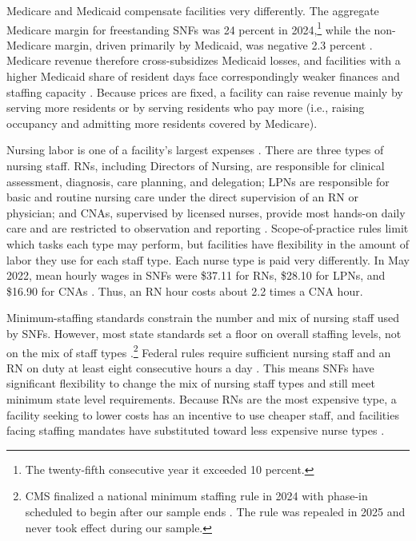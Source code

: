 \documentclass[12pt]{article}
\begin{document}
Medicare and Medicaid compensate facilities very differently. The aggregate Medicare margin for freestanding SNFs was 24 percent in 2024,\footnote{The twenty-fifth consecutive year it exceeded 10 percent.} while the non-Medicare margin, driven primarily by Medicaid, was negative 2.3 percent \citep{MedPAC2026Report}. Medicare revenue therefore cross-subsidizes Medicaid losses, and facilities with a higher Medicaid share of resident days face correspondingly weaker finances and staffing capacity \citep{bowblis_brunt_2025}. Because prices are fixed, a facility can raise revenue mainly by serving more residents or by serving residents who pay more (i.e., raising occupancy and admitting more residents covered by Medicare).

Nursing labor is one of a facility's largest expenses \citep{hawk_et_al_2022}. There are three types of nursing staff. RNs, including Directors of Nursing, are responsible for clinical assessment, diagnosis, care planning, and delegation; LPNs are responsible for basic and routine nursing care under the direct supervision of an RN or physician; and CNAs, supervised by licensed nurses, provide most hands-on daily care and are restricted to observation and reporting \citep{ncsbn2021model}. Scope-of-practice rules limit which tasks each type may perform, but facilities have flexibility in the amount of labor they use for each staff type. Each nurse type is paid very differently. In May 2022, mean hourly wages in SNFs were \$37.11 for RNs, \$28.10 for LPNs, and \$16.90 for CNAs \citep{bls_oews_2022}. Thus, an RN hour costs about 2.2 times a CNA hour.

Minimum-staffing standards constrain the number and mix of nursing staff used by SNFs. However, most state standards set a floor on overall staffing levels, not on the mix of staff types \citep{grabowski_bowblis_2023, bowblis_ghattas_2017}.\footnote{CMS finalized a national minimum staffing rule in 2024 with phase-in scheduled to begin after our sample ends \citep{cms_2024_min_staffing}. The rule was repealed in 2025 \citep{cms_2025_staffing_repeal} and never took effect during our sample.} Federal rules require sufficient nursing staff and an RN on duty at least eight consecutive hours a day \citep{eCFR42CFR483.35}. This means SNFs have significant flexibility to change the mix of nursing staff types and still meet minimum state level requirements. Because RNs are the most expensive type, a facility seeking to lower costs has an incentive to use cheaper staff, and facilities facing staffing mandates have substituted toward less expensive nurse types \citep{bowblis_ghattas_2017}. 
\end{document}
